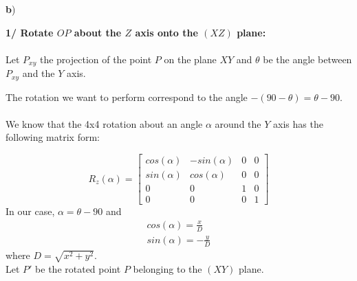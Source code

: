 \documentclass[a4paper,10pt]{article}
\begin{document}
\pagebreak \noindent
\textbf{b})

\bigskip \noindent
\textbf{1/ Rotate $OP$ about the $Z$ axis onto the $(XZ)$ plane:}\\\\
Let $P_{xy}$ the projection of the point $P$ on the plane $XY$ and $\theta$ be the angle between $P_{xy}$ and the $Y$ axis.

\bigskip \noindent
The rotation we want to perform correspond to the angle $-(90 - \theta) = \theta - 90$. \\\\
We know that the 4x4 rotation about an angle $\alpha$ around the $Y$ axis has the following matrix form:

\begin{equation}
R_z(\alpha) =
\begin{bmatrix}
	cos(\alpha) & -sin(\alpha) & 0 & 0 \\
	sin(\alpha) & cos(\alpha)  & 0 & 0 \\
	0 		    & 0 		   & 1 & 0 \\
	0 			& 0 		   & 0 & 1
\end{bmatrix}
\end{equation}
\noindent
In our case, $\alpha = \theta - 90$ and
\begin{equation}
\left.\begin{aligned}
	&cos(\alpha) = \frac{x}{D}& \\
	&sin(\alpha) = -\frac{y}{D}&
\end{aligned}\right.
\end{equation}
where $D = \sqrt{x^2 + y^2}$.\\


\noindent
Let $P'$ be the rotated point $P$ belonging to the $(XY)$ plane.
\end{document}
